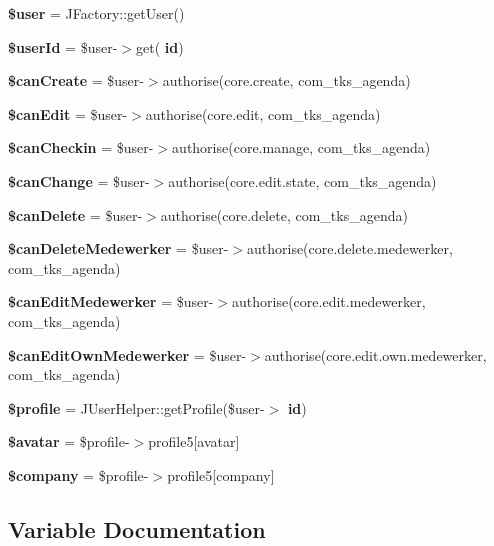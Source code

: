 \begin{DoxyCompactItemize}
\item 
\textbf{ \$user} = J\+Factory\+::get\+User()
\item 
\textbf{ \$user\+Id} = \$user-\/$>$get(\textquotesingle{}\textbf{ id}\textquotesingle{})
\item 
\textbf{ \$can\+Create} = \$user-\/$>$authorise(\textquotesingle{}core.\+create\textquotesingle{}, \textquotesingle{}com\+\_\+tks\+\_\+agenda\textquotesingle{})
\item 
\textbf{ \$can\+Edit} = \$user-\/$>$authorise(\textquotesingle{}core.\+edit\textquotesingle{}, \textquotesingle{}com\+\_\+tks\+\_\+agenda\textquotesingle{})
\item 
\textbf{ \$can\+Checkin} = \$user-\/$>$authorise(\textquotesingle{}core.\+manage\textquotesingle{}, \textquotesingle{}com\+\_\+tks\+\_\+agenda\textquotesingle{})
\item 
\textbf{ \$can\+Change} = \$user-\/$>$authorise(\textquotesingle{}core.\+edit.\+state\textquotesingle{}, \textquotesingle{}com\+\_\+tks\+\_\+agenda\textquotesingle{})
\item 
\textbf{ \$can\+Delete} = \$user-\/$>$authorise(\textquotesingle{}core.\+delete\textquotesingle{}, \textquotesingle{}com\+\_\+tks\+\_\+agenda\textquotesingle{})
\item 
\textbf{ \$can\+Delete\+Medewerker} = \$user-\/$>$authorise(\textquotesingle{}core.\+delete.\+medewerker\textquotesingle{}, \textquotesingle{}com\+\_\+tks\+\_\+agenda\textquotesingle{})
\item 
\textbf{ \$can\+Edit\+Medewerker} = \$user-\/$>$authorise(\textquotesingle{}core.\+edit.\+medewerker\textquotesingle{}, \textquotesingle{}com\+\_\+tks\+\_\+agenda\textquotesingle{})
\item 
\textbf{ \$can\+Edit\+Own\+Medewerker} = \$user-\/$>$authorise(\textquotesingle{}core.\+edit.\+own.\+medewerker\textquotesingle{}, \textquotesingle{}com\+\_\+tks\+\_\+agenda\textquotesingle{})
\item 
\textbf{ \$profile} = J\+User\+Helper\+::get\+Profile(\$user-\/$>$\textbf{ id})
\item 
\textbf{ \$avatar} = \$profile-\/$>$profile5[\textquotesingle{}avatar\textquotesingle{}]
\item 
\textbf{ \$company} = \$profile-\/$>$profile5[\textquotesingle{}company\textquotesingle{}]
\end{DoxyCompactItemize}


\subsection{Variable Documentation}
\mbox{\label{site_2views_2portal_2tmpl_2default_8php_ac62167326fcdc762297fe76407218b55}} 
